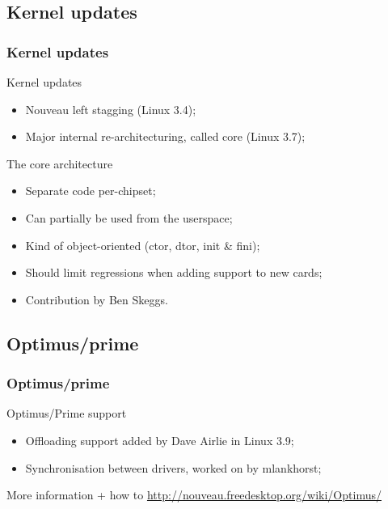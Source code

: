 \documentclass[11pt,english,compress]{beamer}
\begin{document}
\subsection*{Kernel updates}
\begin{frame}
	\frametitle{Kernel updates}

	\begin{block}{Kernel updates}
		\begin{itemize}
			\item Nouveau left stagging (Linux 3.4);
			\item Major internal re-architecturing, called core (Linux 3.7);
		\end{itemize}
	\end{block}

	\begin{block}{The core architecture}
		\begin{itemize}
			\item Separate code per-chipset;
			\item Can partially be used from the userspace;
			\item Kind of object-oriented (ctor, dtor, init \& fini);
			\item Should limit regressions when adding support to new cards;
			\item Contribution by Ben Skeggs.
		\end{itemize}
	\end{block}
\end{frame}

\subsection{Optimus/prime}

\begin{frame}
	\frametitle{Optimus/prime}

	\begin{block}{Optimus/Prime support}
		\begin{itemize}
			\item Offloading support added by Dave Airlie in Linux 3.9;
			\item Synchronisation between drivers, worked on by mlankhorst;
		\end{itemize}
	\end{block}

	\begin{block}{More information + how to}
		\url{http://nouveau.freedesktop.org/wiki/Optimus/}
	\end{block}
\end{frame}
\end{document}
